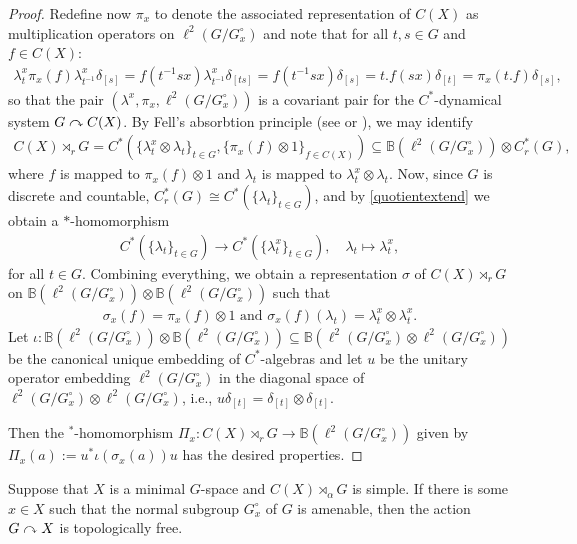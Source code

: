\begin{proof}
	Redefine now $\pi_x$ to denote the associated representation of $C(X)$ as multiplication operators on $\ell^2(G/G_x^\circ)$ and note that for all $t,s \in G$ and $f \in C(X)$:
	\begin{align*}
		\lambda^x_t \pi_x (f) \lambda^x_{t^{-1}} \delta_{[s]} = f(t^{-1}sx)\lambda^x_{t^{-1}} \delta_{[ts]} = f(t^{-1}sx) \delta_{[s]} = t.f(sx) \delta_{[t]} = \pi_x(t.f) \delta_{[s]},
	\end{align*}
	so that the pair $(\lambda^x, \pi_x, \ell^2(G/G_x^\circ))$ is a covariant pair for the $C^*$-dynamical system $G \stackrel{}{\curvearrowright} C(X)$. By Fell's absorbtion principle (see \cite[Proposition 4.1.7]{brown2008c} or \cite[25]{approxtalk}), we may identify
	\begin{align*}
		C(X) \rtimes_r G =C^*\left(\{\lambda^x_t \otimes  \lambda_t \}_{t \in G} , \{\pi_x(f) \otimes 1 \}_{f \in C(X)}\right) \subseteq \mathbb{B}(\ell^2(G/G_x^\circ)) \otimes C_r^*(G),
	\end{align*}
	where $f$ is mapped to $\pi_x(f) \otimes 1$ and $\lambda_t$ is mapped to $\lambda^x_t \otimes \lambda_t$. Now, since $G$ is discrete and countable, $C_r^*(G) \cong C^*(\{\lambda_t\}_{t \in G})$, and by \cref{quotientextend} we obtain a $*$-homomorphism 
\begin{align*}
	 C^*(\{\lambda_t\}_{t \in G}) \to C^*(\{\lambda_t^x\}_{t \in G}), \quad \lambda_t\mapsto  \lambda_t^x,
\end{align*}
for all $t \in G$. Combining everything, we obtain a representation $\sigma$ of $C(X) \rtimes_r G$ on $\mathbb{B}(\ell^2(G/G_x^\circ)) \otimes \mathbb{B}(\ell^2(G/G_x^\circ))$ such that
\begin{align*}
	\sigma_x(f) = \pi_x(f) \otimes 1 \text{  and  } \sigma_x(f)(\lambda_t)=\lambda_t^x \otimes \lambda_t^x.	
\end{align*}
Let $\iota \colon \mathbb{B}(\ell^2(G/G_x^\circ)) \otimes \mathbb{B}(\ell^2(G/G_x^\circ)) \subseteq  \mathbb{B}(\ell^2(G/G_x^\circ) \otimes \ell^2(G/G_x^\circ))$ be the canonical unique embedding of $C^*$-algebras and let $u$ be the unitary operator embedding $\ell^2(G/G_x^\circ)$ in the diagonal space of $\ell^2(G/G_x^\circ) \otimes \ell^2(G/G_x^\circ)$, i.e., $u \delta_{[t]} = \delta_{[t]} \otimes \delta_{[t]}$.

Then the $^*$-homomorphism $\Pi_x \colon C(X) \rtimes_r G \to \mathbb{B}(\ell^2(G/G_x^\circ))$ given by $\Pi_x(a) := u^* \iota(\sigma_x(a)) u $ has the desired properties.
\end{proof}
\begin{proposition}
	Suppose that $X$ is a minimal $G$-space and $C(X) \rtimes_\alpha G$ is simple. If there is some $x \in X$ such that the normal subgroup $G_x^\circ$ of $G$ is amenable, then the action $G \stackrel{ }{\curvearrowright} X$ is topologically free. 
	\label{ozawa15pt2}
\end{proposition}
